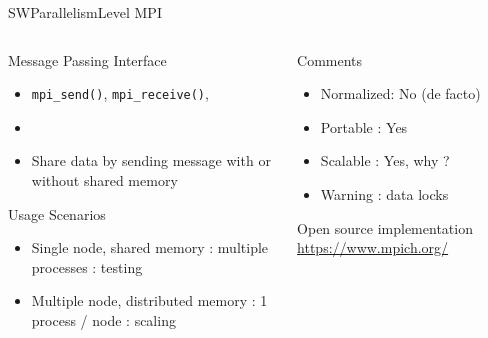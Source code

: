 %
\begin{Frame}{SWParallelismLevel MPI}
  \begin{columns}[t]
    \begin{column}{\HW} %
      \begin{block}{Message Passing Interface}
        \begin{itemize}
        \item \texttt{mpi\_send()}, \texttt{mpi\_receive()}, 
        \item
        \item Share data by sending message with or without shared memory
        \end{itemize}
      \end{block} 
      \begin{block}{Usage Scenarios}
        \begin{itemize}
        \item Single node, shared memory : multiple processes : testing
        \item Multiple node, distributed memory : 1 process / node : scaling
        \end{itemize}
      \end{block} 
    \end{column}
    
    \begin{column}{\HW} %
      \begin{alertblock}{Comments}
        \begin{itemize}
        \item Normalized: No (de facto)
        \item Portable : Yes
        \item Scalable : Yes, why ?
        \item Warning : data locks 
        \end{itemize}

      \end{alertblock}   
        Open source implementation \href{https://www.mpich.org/}{https://www.mpich.org/}
    \end{column}
  \end{columns}  
\end{Frame}


